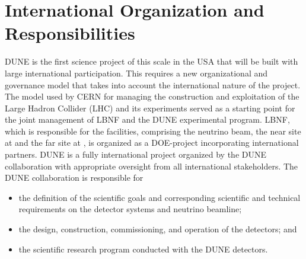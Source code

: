 \section{International Organization and Responsibilities}

DUNE is the first science project of this scale in the USA that will be built with large
international participation. This requires a new organizational and governance model that takes into account the international nature of the project.
The
model used by CERN for managing the construction and exploitation of the Large Hadron Collider (LHC) and its experiments served as a starting point for the joint management of LBNF and the DUNE experimental program. 
LBNF, which is responsible for the facilities, comprising the neutrino beam, the near site at \fnal and the far site at \surf, is organized as a
DOE-\fnal project incorporating international partners. 
DUNE is a fully international project
organized by the DUNE collaboration with appropriate oversight from all international stakeholders.
The DUNE collaboration is responsible for
\begin{itemize}
\item the definition of the scientific goals and corresponding scientific and technical requirements on the detector systems and neutrino beamline;
\item the design, construction, commissioning, and operation of the detectors; and
\item the scientific research program conducted with the DUNE detectors. 
\end{itemize}

